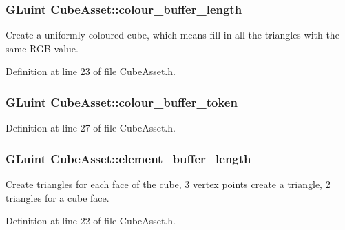 \subsubsection[{colour\+\_\+buffer\+\_\+length}]{\setlength{\rightskip}{0pt plus 5cm}G\+Luint Cube\+Asset\+::colour\+\_\+buffer\+\_\+length\hspace{0.3cm}{\ttfamily [private]}}\label{class_cube_asset_a12de81acb020b82bd26cda6284910012}
Create a uniformly coloured cube, which means fill in all the triangles with the same R\+G\+B value. 

Definition at line 23 of file Cube\+Asset.\+h.

\hypertarget{class_cube_asset_a75f98d346175cd91cdee04f1885f5327}{}
\subsubsection[{colour\+\_\+buffer\+\_\+token}]{\setlength{\rightskip}{0pt plus 5cm}G\+Luint Cube\+Asset\+::colour\+\_\+buffer\+\_\+token\hspace{0.3cm}{\ttfamily [private]}}\label{class_cube_asset_a75f98d346175cd91cdee04f1885f5327}


Definition at line 27 of file Cube\+Asset.\+h.

\hypertarget{class_cube_asset_ac66c2ec869f392515dad4ebda1fe4792}{}
\subsubsection[{element\+\_\+buffer\+\_\+length}]{\setlength{\rightskip}{0pt plus 5cm}G\+Luint Cube\+Asset\+::element\+\_\+buffer\+\_\+length\hspace{0.3cm}{\ttfamily [private]}}\label{class_cube_asset_ac66c2ec869f392515dad4ebda1fe4792}
Create triangles for each face of the cube, 3 vertex points create a triangle, 2 triangles for a cube face. 

Definition at line 22 of file Cube\+Asset.\+h.

\hypertarget{class_cube_asset_a4fae699256e7c5633a8174a93ca8a0ec}{}
